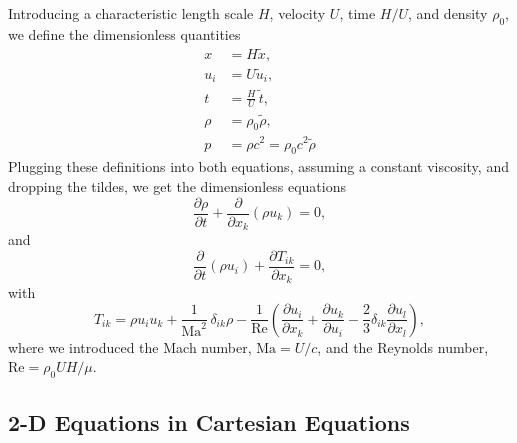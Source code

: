 \documentclass[11pt]{article}
\newcommand{\Ma}{\text{Ma}}
\newcommand{\Rey}{\text{Re}}
\begin{document}
Introducing a characteristic length scale $H$, velocity $U$, time $H/U$, and density $\rho_0$, we define the dimensionless quantities
\begin{align}
x &= H\tilde x,\\
u_i &= U \tilde{u}_i,\\
t &= \frac{H}{U}\,\tilde t,\\
\rho &= \rho_0 \tilde\rho,\\
p &= \rho c^2 = \rho_0 c^2 \tilde\rho
\end{align}
Plugging these definitions into both equations, assuming a constant viscosity, and dropping the tildes, we get the dimensionless equations
\begin{equation}
\frac{\partial \rho}{\partial t} + \frac{\partial}{\partial x_k}\left(\rho u_k\right) = 0,
\end{equation}
and 
\begin{equation}
\frac{\partial}{\partial t}\left(\rho u_i\right) + \frac{\partial T_{ik}}{\partial x_k} = 0,
\end{equation}
with
\begin{equation}
T_{ik} = \rho u_i u_k + \frac{1}{\Ma^2}\,\delta_{ik}\rho - \frac{1}{\Rey}\left(\frac{\partial u_i}{\partial x_k} + \frac{\partial u_k}{\partial u_i} - \frac{2}{3}\delta_{ik}\frac{\partial u_l}{\partial x_l}\right),
\end{equation}
where we introduced the Mach number, $\Ma = U/c$, and the Reynolds number, $\Rey = \rho_0 UH/\mu$.

\subsection{2-D Equations in Cartesian Equations}
\end{document}

